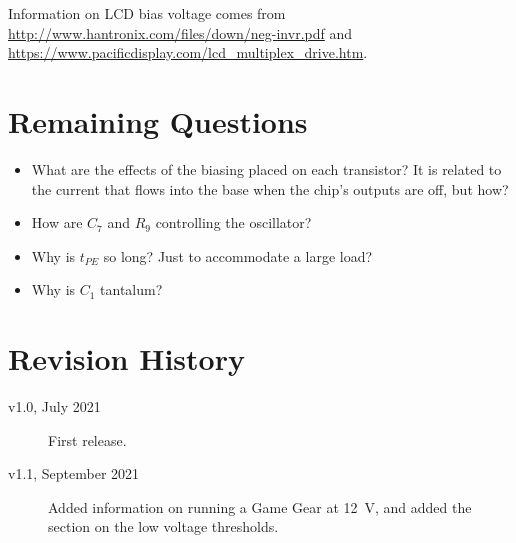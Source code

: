 \documentclass{article}
\begin{document}
Information on LCD bias voltage comes from
\url{http://www.hantronix.com/files/down/neg-invr.pdf} and
\url{https://www.pacificdisplay.com/lcd_multiplex_drive.htm}.
\section{Remaining Questions}
\label{sec:remaining_questions}
\begin{itemize}
\item What are the effects of the biasing placed on each transistor?
  It is related to the current that flows into the base when the
  chip's outputs are off, but how?
\item How are $C_7$ and $R_9$ controlling the oscillator?
\item Why is $t_{PE}$ so long? Just to accommodate a large load?
\item Why is $C_1$ tantalum?
\end{itemize}

\section{Revision History}
\begin{description}
\item[v1.0, July 2021] First release.
\item[v1.1, September 2021] Added information on running a Game Gear
  at \qty{12}{\volt}, and added the section on the low voltage thresholds.
\end{description}
\end{document}
